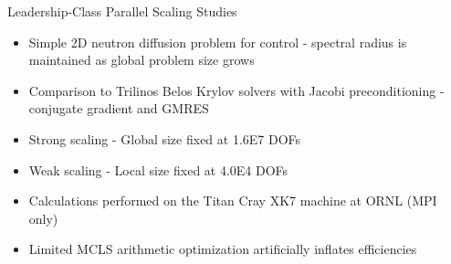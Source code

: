 \documentclass{beamer}
\begin{document}
\begin{frame}{Leadership-Class Parallel Scaling Studies}

  \begin{itemize}
  \item Simple 2D neutron diffusion problem for control - spectral
    radius is maintained as global problem size grows
    \medskip
  \item Comparison to Trilinos Belos Krylov solvers with Jacobi
    preconditioning - conjugate gradient and GMRES
    \medskip
  \item Strong scaling - Global size fixed at 1.6E7 DOFs
    \medskip
  \item Weak scaling - Local size fixed at 4.0E4 DOFs
    \medskip
  \item Calculations performed on the Titan Cray XK7 machine at ORNL
    (MPI only)
    \medskip
  \item Limited MCLS arithmetic optimization artificially inflates
    efficiencies
  \end{itemize}

\end{frame}
\end{document}
